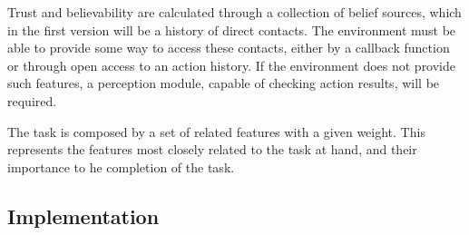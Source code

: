 Trust and believability are calculated through a collection of belief sources, which in the first version will be a history of direct contacts. The environment must be able to provide some way to access these contacts, either by a callback function or through open access to an action history. If the environment does not provide such features, a perception module, capable of checking action results, will be required.

The task is composed by a set of related features with a given weight. This represents the features most closely related to the task at hand, and their importance to he completion of the task.

\subsection{Implementation}




